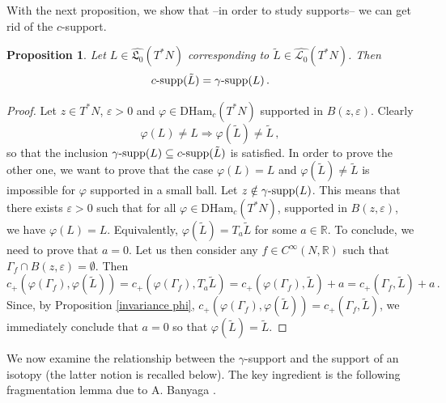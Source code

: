 \documentclass{article}
\newcommand{\1}{\mathbbm{1}}
\newcommand{\supp}{\text{supp}}
\newtheorem{prp}[thm]{Proposition}
\theoremstyle{remark}
\begin{document}
{{\noindent With the next proposition, we show that --in order to study supports-- we can get rid of the $c$-support.   
\begin{prp}
Let $L \in \widehat{\mathfrak{L}_0}(T^*N)$ corresponding to $\tilde{L} \in \widehat{\mathscr{L}_0}(T^*N)$. Then
\begin{equation}
c\textnormal{-\supp}(\tilde{L})=\gamma\textnormal{-\supp}(L)\, .
\end{equation}
\end{prp}
\begin{proof} Let $z \in T^*N$, $\varepsilon >0$ and $\varphi \in \mathrm{DHam}_c(T^*N)$ supported in $B(z,\varepsilon)$. Clearly 
$$\varphi(L) \ne L \Rightarrow \varphi(\tilde{L}) \ne \tilde{L}\, ,$$
so that the inclusion $\gamma\textnormal{-supp}(L) \subseteq c\textnormal{-supp}(\tilde{L})$ is satisfied. In order to prove the other one, we want to prove that the case $\varphi(L) = L$ and $\varphi(\tilde{L}) \ne \tilde{L}$ is impossible for $\varphi$ supported in a small ball. Let $z \notin \gamma\textnormal{-supp}(L)$. This means that there exists $\varepsilon > 0$ such that for all $\varphi \in \mathrm{DHam}_c(T^*N)$, supported in $B(z,\varepsilon)$, we have $\varphi(L) = L$. Equivalently, $\varphi(\tilde{L}) = T_a \tilde{L}$ for some $a \in \mathbb{R}$. To conclude, we need to prove that $a = 0$. Let us then consider any $f \in C^{\infty}(N,\mathbb{R})$ such that $\Gamma_f \cap B(z,\varepsilon) = \emptyset$. Then
$$c_+(\varphi(\Gamma_f),\varphi(\tilde L)) = c_+(\varphi(\Gamma_f),T_a\tilde{L}) = c_+(\varphi(\Gamma_f),\tilde{L}) + a = c_+(\Gamma_f,\tilde{L}) + a\, .$$
Since, by Proposition \ref{invariance phi}, $c_+(\varphi(\Gamma_f),\varphi(\tilde L)) = c_+(\Gamma_f,\tilde{L})$, we immediately conclude that $a = 0$ so that $\varphi(\tilde{L}) = \tilde{L}$. 
\end{proof}
\indent We now examine the relationship between the $\gamma$-support and the support of an isotopy (the latter notion is recalled below). The key ingredient is the following fragmentation lemma due to A. Banyaga \cite[Lemma~III.3.2]{ban78}.

}}
\end{document}
